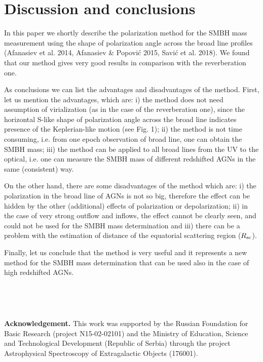\documentclass{iau}
\begin{document}
\section{Discussion and conclusions}

In this paper we shortly describe the polarization method for the SMBH mass measurement using the 
shape of polarization angle across the broad line profiles (Afanasiev et al.
2014, Afanasiev \& Popovi\'c 2015, Savi\'c et al. 2018). We found that our method gives
very good results in comparison with the reverberation one.

As conclusions we can list the advantages and disadvantages of the method. First,
let us  mention the advantages, which  are:
i) the method does not need assumption of virialization (as in the case of the reverberation one), 
since the horizontal S-like shape of polarization angle across the broad line indicates presence 
of the Keplerian-like motion (see Fig. 1); ii) the method is not time consuming, i.e.
from one epoch  observation of
broad line, one can obtain the SMBH mass; iii) the method can be applied to all broad lines from 
the UV to the optical, i.e. one can measure the SMBH mass of different redshifted AGNs in the same
(consistent) way. 

On the other hand, there are some disadvantages of the method which  are: 
i) the polarization in the broad line of 
AGNs is not so big, therefore the effect can be hidden by the other (additional) effects of 
polarization or depolarization; ii) in the case of very strong outflow and inflows, the effect 
cannot be clearly seen, and could not be used for the SMBH mass
determination and iii) there can be 
a problem with the estimation of  distance of the equatorial scattering region ($R_{\rm sc}$).

Finally, let us conclude that the method is very useful and it represents a new method 
for the SMBH mass determination that can be used also in the case of high redshifted AGNs.

\

\

{\bf Acknowledgement.} 
 This work was supported by the Russian
Foundation for Basic Research ({project N15-02-02101}) and
the Ministry of Education, Science and Technological Development (Republic of Serbia) through
the project Astrophysical Spectroscopy of Extragalactic Objects
(176001).
\end{document}
